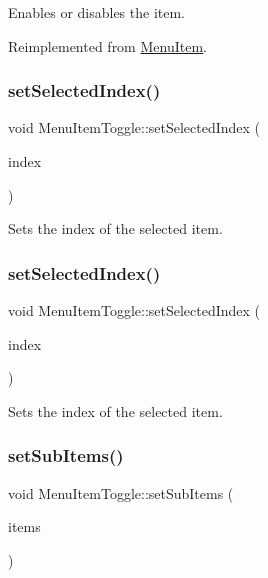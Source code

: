 Enables or disables the item. 

Reimplemented from \hyperlink{classMenuItem_abe370fd6258192233b6bd9534344773b}{Menu\+Item}.

\mbox{\label{classMenuItemToggle_af3303da9456dd04fc6e212c57c547f53}} 
\subsubsection{\texorpdfstring{set\+Selected\+Index()}{setSelectedIndex()}\hspace{0.1cm}{\footnotesize\ttfamily [1/2]}}
{\footnotesize\ttfamily void Menu\+Item\+Toggle\+::set\+Selected\+Index (\begin{DoxyParamCaption}\item[{unsigned int}]{index }\end{DoxyParamCaption})}

Sets the index of the selected item. \mbox{\label{classMenuItemToggle_af3303da9456dd04fc6e212c57c547f53}} 
\subsubsection{\texorpdfstring{set\+Selected\+Index()}{setSelectedIndex()}\hspace{0.1cm}{\footnotesize\ttfamily [2/2]}}
{\footnotesize\ttfamily void Menu\+Item\+Toggle\+::set\+Selected\+Index (\begin{DoxyParamCaption}\item[{unsigned int}]{index }\end{DoxyParamCaption})}

Sets the index of the selected item. \mbox{\label{classMenuItemToggle_adf096428e8dce43a7e2870a8dc2d62fb}} 
\subsubsection{\texorpdfstring{set\+Sub\+Items()}{setSubItems()}\hspace{0.1cm}{\footnotesize\ttfamily [1/2]}}
{\footnotesize\ttfamily void Menu\+Item\+Toggle\+::set\+Sub\+Items (\begin{DoxyParamCaption}\item[{const \hyperlink{classVector}{Vector}$<$ \hyperlink{classMenuItem}{Menu\+Item} $\ast$$>$ \&}]{items }\end{DoxyParamCaption})\hspace{0.3cm}{\ttfamily [inline]}}


